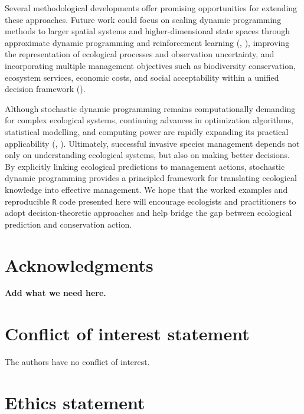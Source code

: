 \documentclass[
  11pt,
  a4paper,
]{article}
\begin{document}
Several methodological developments offer promising opportunities for extending these approaches. Future work could focus on scaling dynamic programming methods to larger spatial systems and higher-dimensional state spaces through approximate dynamic programming and reinforcement learning (, ), improving the representation of ecological processes and observation uncertainty, and incorporating multiple management objectives such as biodiversity conservation, ecosystem services, economic costs, and social acceptability within a unified decision framework ().

Although stochastic dynamic programming remains computationally demanding for complex ecological systems, continuing advances in optimization algorithms, statistical modelling, and computing power are rapidly expanding its practical applicability (, ). Ultimately, successful invasive species management depends not only on understanding ecological systems, but also on making better decisions. By explicitly linking ecological predictions to management actions, stochastic dynamic programming provides a principled framework for translating ecological knowledge into effective management. We hope that the worked examples and reproducible \texttt{R} code presented here will encourage ecologists and practitioners to adopt decision-theoretic approaches and help bridge the gap between ecological prediction and conservation action.

\section{Acknowledgments}\label{acknowledgments}

\textbf{Add what we need here.}

\section{Conflict of interest statement}\label{conflict-of-interest-statement}

The authors have no conflict of interest.

\section{Ethics statement}\label{ethics-statement}
\end{document}
